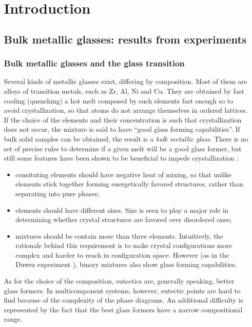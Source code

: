 \chapter{Introduction \label{ch:Introduction}}

\section{Bulk metallic glasses: results from experiments}

\subsection{Bulk metallic glasses and the glass transition\label{sec:UndeformedGlasses}}

Several kinds of metallic glasses exist, differing by composition. Most of them are alloys of transition metals, such as Zr, Al, Ni and Cu. They are obtained by fast cooling (quenching) a hot melt composed by such elements fast enough so to avoid crystallization, so that atoms do not arrange themselves in ordered lattices. If the choice of the elements and their concentration is such that crystallization does not occur, the mixture is said to have ``good glass forming capabilities''. If bulk solid samples can be obtained, the result is a \emph{bulk metallic glass}. There is no set of precise rules to determine if a given melt will be a good glass former, but still some features have been shown to be beneficial to impede crystallization \cite{chen2011brief, inoue2000stabilization}:
\begin{itemize}
	\item consituting elements should have negative heat of mixing, so that unlike elements stick together forming energetically favored structures, rather than separating into pure phases;
	\item elements should have different sizes. Size is seen to play a major role in determining whether crystal structures are favored over disordered ones;
	\item mixtures should be contain more than three elements. Intuitively, the rationale behind this requirement is to make crystal configurations more complex and harder to reach in configuration space. However (as in the Duwez experiment \cite{klement1960noncrystalline}), binary mixtures also show glass forming capabilities. 
\end{itemize}
As for the choice of the composition, eutectics are, generally speaking, better glass formers. In multicomponent systems, however, eutectic points are hard to find because of the complexity of the phase diagrams. An additional difficulty is represented by the fact that the best glass  formers have a narrow compositional range.\\

